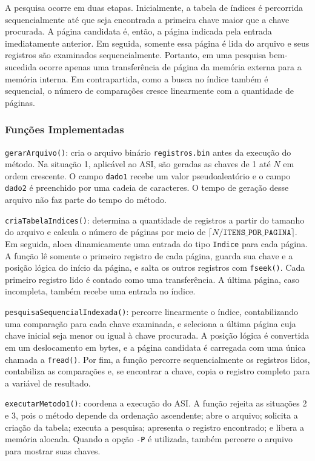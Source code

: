 \documentclass[12pt,a4paper]{article}
\begin{document}
A pesquisa ocorre em duas etapas. Inicialmente, a tabela de índices é percorrida
sequencialmente até que seja encontrada a primeira chave maior que a chave procurada. A
página candidata é, então, a página indicada pela entrada imediatamente anterior. Em
seguida, somente essa página é lida do arquivo e seus registros são examinados
sequencialmente. Portanto, em uma pesquisa bem-sucedida ocorre apenas uma transferência
de página da memória externa para a memória interna. Em contrapartida, como a busca no
índice também é sequencial, o número de comparações cresce linearmente com a quantidade
de páginas.

\subsubsection{Funções Implementadas}

\texttt{gerarArquivo()}: cria o arquivo binário \texttt{registros.bin} antes da
execução do método. Na situação 1, aplicável ao ASI, são geradas as chaves de 1 até
$N$ em ordem crescente. O campo \texttt{dado1} recebe um valor pseudoaleatório e o
campo \texttt{dado2} é preenchido por uma cadeia de caracteres. O tempo de geração
desse arquivo não faz parte do tempo do método.

\texttt{criaTabelaIndices()}: determina a quantidade de registros a partir do tamanho
do arquivo e calcula o número de páginas por meio de
$\lceil N/\texttt{ITENS\_POR\_PAGINA}\rceil$. Em seguida, aloca dinamicamente uma
entrada do tipo \texttt{Indice} para cada página. A função lê somente o primeiro
registro de cada página, guarda sua chave e a posição lógica do início da página, e
salta os outros registros com \texttt{fseek()}. Cada primeiro registro lido é contado
como uma transferência. A última página, caso incompleta, também recebe uma entrada no
índice.

\texttt{pesquisaSequencialIndexada()}: percorre linearmente o índice, contabilizando
uma comparação para cada chave examinada, e seleciona a última página cuja chave
inicial seja menor ou igual à chave procurada. A posição lógica é convertida em um
deslocamento em bytes, e a página candidata é carregada com uma única chamada a
\texttt{fread()}. Por fim, a função percorre sequencialmente os registros lidos,
contabiliza as comparações e, se encontrar a chave, copia o registro completo para a
variável de resultado.

\texttt{executarMetodo1()}: coordena a execução do ASI. A função rejeita as situações
2 e 3, pois o método depende da ordenação ascendente; abre o arquivo; solicita a
criação da tabela; executa a pesquisa; apresenta o registro encontrado; e libera a
memória alocada. Quando a opção \texttt{-P} é utilizada, também percorre o arquivo para
mostrar suas chaves.
\end{document}
